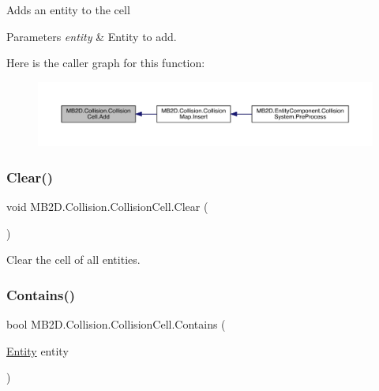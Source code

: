 Adds an entity to the cell 


\begin{DoxyParams}{Parameters}
{\em entity} & Entity to add.\\
\hline
\end{DoxyParams}
Here is the caller graph for this function\+:\nopagebreak
\begin{figure}[H]
\begin{center}
\leavevmode
\includegraphics[width=350pt]{class_m_b2_d_1_1_collision_1_1_collision_cell_a4fc338d7dbfd7418f5493424c5937213_icgraph}
\end{center}
\end{figure}
\hypertarget{class_m_b2_d_1_1_collision_1_1_collision_cell_ae4ff144f6c768003d8be46e17e130646}{}\label{class_m_b2_d_1_1_collision_1_1_collision_cell_ae4ff144f6c768003d8be46e17e130646} 
\subsubsection{\texorpdfstring{Clear()}{Clear()}}
{\footnotesize\ttfamily void M\+B2\+D.\+Collision.\+Collision\+Cell.\+Clear (\begin{DoxyParamCaption}{ }\end{DoxyParamCaption})\hspace{0.3cm}{\ttfamily [inline]}}



Clear the cell of all entities. 

\hypertarget{class_m_b2_d_1_1_collision_1_1_collision_cell_aa4be244387541ee24d88da80331b3438}{}\label{class_m_b2_d_1_1_collision_1_1_collision_cell_aa4be244387541ee24d88da80331b3438} 
\subsubsection{\texorpdfstring{Contains()}{Contains()}}
{\footnotesize\ttfamily bool M\+B2\+D.\+Collision.\+Collision\+Cell.\+Contains (\begin{DoxyParamCaption}\item[{\hyperlink{class_m_b2_d_1_1_entity_component_1_1_entity}{Entity}}]{entity }\end{DoxyParamCaption})\hspace{0.3cm}{\ttfamily [inline]}}



